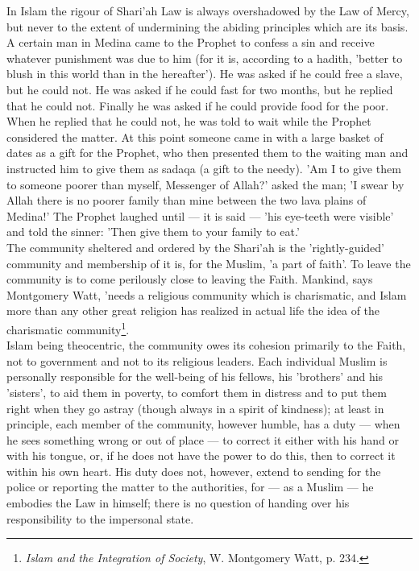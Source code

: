 \documentclass[11pt, b5paper, twoside]{book}
\begin{document}
In Islam the rigour of Shari'ah Law is always overshadowed by the Law of Mercy, but never to the 
extent of undermining the abiding principles which are its basis. A certain man in Medina came to the 
Prophet to confess a sin and receive whatever punishment was due to him (for it is, according to a 
hadith, 'better to blush in this world than in the hereafter'). He was asked if he could free a 
slave, but he could not. He was asked if he could fast for two months, but he replied that he could 
not. Finally he was asked if he could provide food for the poor. When he replied that he could not, 
he was told to wait while the Prophet considered the matter. At this point someone came in with a 
large basket of dates as a gift for the Prophet, who then presented them to the waiting man and 
instructed him to give them as sadaqa (a gift to the needy). 'Am I to give them to someone poorer 
than myself, Messenger of Allah?' asked the man; 'I swear by Allah there is no poorer family than 
mine between the two lava plains of Medina!' The Prophet laughed until --- it is said --- 'his eye-teeth 
were visible' and told the sinner: 'Then give them to your family to eat.' \\

The community sheltered and ordered by the Shari'ah is the 'rightly-guided' community and membership 
of it is, for the Muslim, 'a part of faith'. To leave the community is to come perilously close to 
leaving the Faith. Mankind, says Montgomery Watt, 'needs a religious community which is charismatic, 
and Islam more than any other great religion has realized in actual life the idea of the charismatic 
community\footnote{\emph{Islam and the Integration of Society}, W. Montgomery Watt, p. 234.}. \\

Islam being theocentric, the community owes its cohesion primarily to the Faith, not to government 
and not to its religious leaders. Each individual Muslim is personally responsible for the well-being 
of his fellows, his 'brothers' and his 'sisters', to aid them in poverty, to comfort them in distress 
and to put them right when they go astray (though always in a spirit of kindness); at least in 
principle, each member of the community, however humble, has a duty --- when he sees something wrong or 
out of place --- to correct it either with his hand or with his tongue, or, if he does not have the 
power to do this, then to correct it within his own heart. His duty does not, however, extend to 
sending for the police or reporting the matter to the authorities, for --- as a Muslim --- he embodies 
the Law in himself; there is no question of handing over his responsibility to the impersonal state. \\
\end{document}
